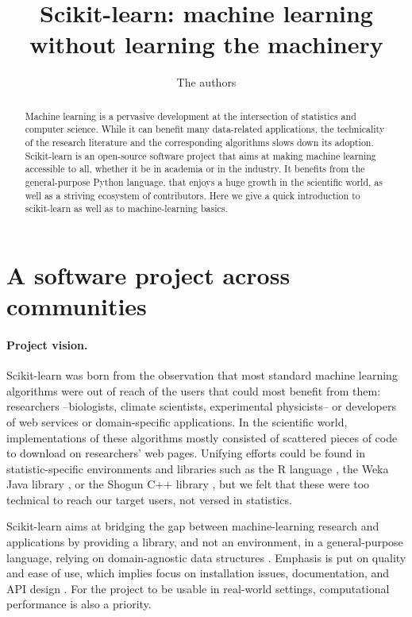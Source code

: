 \documentclass[a4paper]{article}
\title{Scikit-learn: machine learning without learning the machinery}
\author{The authors}
\begin{document}
\lstset{language=Python}

\maketitle

\begin{abstract}
Machine learning is a pervasive development at the intersection of
statistics and computer science. While it can benefit many
data-related applications, the technicality of the research literature
and the corresponding algorithms slows down its adoption. Scikit-learn is
an open-source software project that aims at making machine learning
accessible to all, whether it be in academia or in the industry. It
benefits from
the general-purpose Python language, that enjoys a huge growth in
the scientific world, as well as a striving ecosystem of contributors.
Here we give a quick introduction to scikit-learn as well as to
machine-learning basics.
\end{abstract}

\section{A software project across communities}

\paragraph{Project vision.}
%
Scikit-learn was born from the observation that most standard
machine learning algorithms were out of reach of the users that could
most benefit from them: researchers --biologists, climate
scientists, experimental physicists-- or developers of web
services or domain-specific applications.
%
In the scientific world, implementations of these algorithms
mostly consisted of scattered pieces of code to download
on researchers' web pages. Unifying efforts could be found in
statistic-specific environments and libraries such as the R
language \cite{Rmanual}, the Weka Java library \cite{hall2009weka}, or
the Shogun C++ library \cite{sonnenburg2010}, but we felt that these were
too technical to reach our target users, not versed in statistics.

Scikit-learn aims at bridging the gap between machine-learning research and
applications by providing a library, and not an environment, in a
general-purpose language, relying on domain-agnostic data structures
\cite{pedregosa2011}. Emphasis is put on quality and ease of use, which
implies focus on installation issues, documentation, and API design
\cite{buitinck2013ecml}. For the project to be usable in real-world
settings, computational performance is also a priority.
\end{document}

